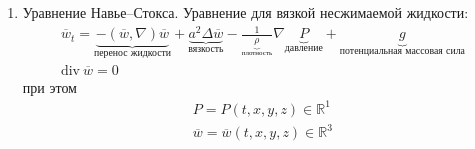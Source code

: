\begin{enumerate}
\begin{comment}
			\[
				\begin{aligned}
					g_{vm} = \begin{pmatrix} c^2 & 0 & 0 & 0 \\ 0 & -1 & 0 & 0 \\ 0 & 0 & -1 & 0 \\ 0 & 0 & 0 & -1\end{pmatrix}	
				\end{aligned}
			\]
			Вот это метрический тензор.
		}
	\end{comment}
	\item{
			Уравнение Навье--Стокса. Уравнение для вязкой несжимаемой жидкости:
			\[
				\begin{aligned}
				\overline{w}_t = \underbrace{-\left( \overline{w}, \nabla\right) \overline{w}}_{\text{перенос жидкости}} + \underbrace{a^2 \Delta \overline{w}}_\text{вязкость} - \frac{1}{\underbrace{\rho}_{\text{плотность}}} \nabla \underbrace{P}_{\text{давление}} + \underbrace{g}_{\text{потенциальная массовая сила}} \\
				\mathrm{div} ~ \overline{w} = 0
			\end{aligned}
			\]
			при этом
			\[
				\begin{aligned}
					P = P(t,x,y,z) \in \mathbb{R}^1 \\
					\overline{w} = \overline{w} (t,x,y,z) \in \mathbb{R}^3
				\end{aligned}
			\]
		}
\end{enumerate}
